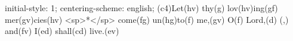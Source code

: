initial-style: 1;
centering-scheme: english;
(c4)Let(hv) thy(g) lov(hv)ing(gf) mer(gv)cies(hv) <sp>*</sp> come(fg) un(hg)to(f) me,(gv) O(f) Lord,(d) (,) and(fv) I(ed) shall(cd) live.(ev)
